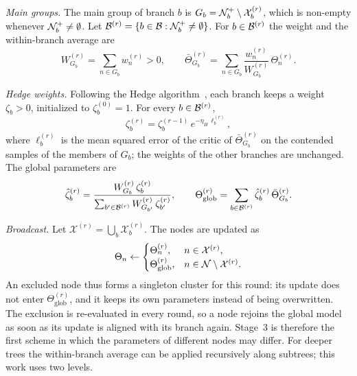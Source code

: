 \begin{EnChapter}
\emph{Main groups.} The main group of branch $b$ is
$G_b = \mathcal{N}_b^{+} \setminus \mathcal{X}_b^{(r)}$, which is non-empty whenever
$\mathcal{N}_b^{+} \neq \emptyset$. Let $\mathcal{B}^{(r)} = \{ b \in \mathcal{B} : \mathcal{N}_b^{+} \neq \emptyset \}$.
For $b \in \mathcal{B}^{(r)}$ the weight and the within-branch average are
\begin{equation}
  W_{G_b}^{(r)} = \sum_{n \in G_b} w_n^{(r)} > 0, \qquad
  \bar\Theta_{G_b}^{(r)} = \sum_{n \in G_b} \frac{w_n^{(r)}}{W_{G_b}^{(r)}}\, \Theta_n^{(r)} .
\end{equation}

\emph{Hedge weights.} Following the Hedge algorithm~\cite{freund1997hedge}, each
branch keeps a weight $\zeta_b > 0$, initialized to $\zeta_b^{(0)} = 1$. For every
$b \in \mathcal{B}^{(r)}$,
\begin{equation}
  \zeta_b^{(r)} = \zeta_b^{(r-1)}\, e^{-\eta_H\, \ell_b^{(r)}},
\end{equation}
where $\ell_b^{(r)}$ is the mean squared error of the critic of
$\bar\Theta_{G_b}^{(r)}$ on the contended samples of the members of $G_b$; the
weights of the other branches are unchanged. The global parameters are
\begin{equation}
  \hat\zeta_b^{(r)} = \frac{W_{G_b}^{(r)}\, \zeta_b^{(r)}}{\sum_{b' \in \mathcal{B}^{(r)}} W_{G_{b'}}^{(r)}\, \zeta_{b'}^{(r)}}, \qquad
  \Theta_{\mathrm{glob}}^{(r)} = \sum_{b \in \mathcal{B}^{(r)}} \hat\zeta_b^{(r)}\, \bar\Theta_{G_b}^{(r)} .
  \label{eq:hedge}
\end{equation}

\emph{Broadcast.} Let $\mathcal{X}^{(r)} = \bigcup_{b} \mathcal{X}_b^{(r)}$. The nodes
are updated as
\begin{equation}
  \Theta_n \leftarrow
  \begin{cases}
    \Theta_n^{(r)}, & n \in \mathcal{X}^{(r)}, \\
    \Theta_{\mathrm{glob}}^{(r)}, & n \in \mathcal{N} \setminus \mathcal{X}^{(r)} .
  \end{cases}
  \label{eq:stage3-broadcast}
\end{equation}
An excluded node thus forms a singleton cluster for this round: its update does not
enter $\Theta_{\mathrm{glob}}^{(r)}$, and it keeps its own parameters instead of
being overwritten. The exclusion is re-evaluated in every round, so a node rejoins
the global model as soon as its update is aligned with its branch again. Stage~3 is
therefore the first scheme in which the parameters of different nodes may differ.
For deeper trees the within-branch average can be applied recursively along
subtrees; this work uses two levels.


\end{EnChapter}
